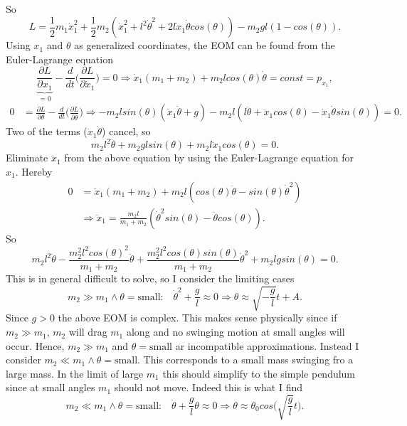 \begin{example}
	So
	\begin{equation}
		L=\frac{1}{2}m_1\dot{x}_1^2+\frac{1}{2}m_2(\dot{x}_1^2+l^2\dot{\theta}^2+2l\dot{x}_1\dot{\theta}cos(\theta))-m_2gl(1-cos(\theta)).
	\end{equation} 
	Using $x_1$ and $\theta$ as generalized coordinates, the EOM can be found from the Euler-Lagrange equation
	\begin{equation}
		\underbrace{\frac{\partial L}{\partial x_1}}_{=0}-\frac{d}{dt}\bigg(\frac{\partial L}{\partial \dot{x}_1}\bigg)=0\Rightarrow \dot{x}_1(m_1+m_2)+m_2lcos(\theta)\dot{\theta}=const=p_{x_1},
	\end{equation} 
	\begin{equation}
		\begin{split}
			0&=\frac{\partial L}{\partial \theta}-\frac{d}{dt}\bigg(\frac{\partial L}{\partial \dot{\theta}}\bigg)\Rightarrow -m_2lsin(\theta)(\dot{x}_1\dot{\theta}+g)-m_2l(l\ddot{\theta}+\ddot{x}_1cos(\theta)-\dot{x}_1\dot{\theta}sin(\theta))=0.
		\end{split}
	\end{equation} 
	Two of the terms ($\dot{x}_1\dot{\theta}$) cancel, so
	\begin{equation}
		m_2l^2\ddot{\theta}+m_2glsin(\theta)+m_2l\ddot{x}_1cos(\theta)=0.
	\end{equation} 
	Eliminate $\ddot{x}_1$ from the above equation by using the Euler-Lagrange equation for $x_1$. Hereby
	\begin{equation}
		\begin{split}
			0&=\ddot{x}_1(m_1+m_2)+m_2l(cos(\theta)\ddot{\theta}-sin(\theta)\dot{ \theta}^2)\\
			&\Rightarrow \ddot{x}_1=\frac{m_2l}{m_1+m_2}(\dot{\theta}^2sin(\theta)-\ddot{\theta}cos(\theta)).
		\end{split}
	\end{equation} 
	So
	\begin{equation}
		m_2l^2\ddot{\theta}-\frac{m_2^2l^2cos(\theta)^2}{m_1+m_2}\ddot{\theta}+\frac{m_2^2l^2cos(\theta)sin(\theta)}{m_1+m_2}\dot{\theta}^2+m_2lgsin(\theta)=0.
	\end{equation} 
	This is in general difficult to solve, so I consider the  limiting cases
	\begin{equation}
		m_2\gg m_1 \wedge \theta=\text{small:}\quad \dot{\theta}^2+\frac{g}{l}\approx 0 \Rightarrow \theta\approx
		\sqrt{-\frac{g}{l}}t+A.
	\end{equation} 
	Since $g>0$ the above EOM is complex. This makes sense physically since if $m_2\gg m_1$, $m_2$ will drag $m_1$ along and no swinging motion at small angles will occur. Hence, $m_2\gg m_1$ and $\theta=\text{small}$ ar incompatible approximations. Instead I consider $m_2\ll m_1 \wedge \theta=\text{small}$. This corresponds to a small mass swinging fro a large mass. In the limit of large $m_1$ this should simplify to the simple pendulum since at small angles $m_1$ should not move. Indeed this is what I find
	\begin{equation}
		m_2\ll m_1 \wedge \theta=\text{small:}\quad \ddot{\theta}+\frac{g}{l}\theta\approx 0 \Rightarrow \theta\approx \theta_0cos\bigg(\sqrt{\frac{g}{l}}t\bigg).
	\end{equation} 
\end{example}
